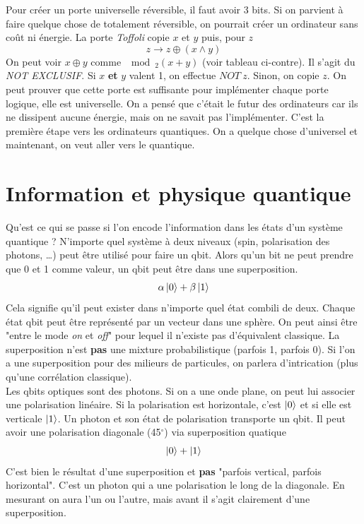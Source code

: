 Pour créer un porte universelle réversible, il faut avoir 3 bits. Si on parvient à faire 
quelque chose de totalement réversible, on pourrait créer un ordinateur sans coût ni énergie. La
porte \textit{Toffoli} copie $x$ et $y$ puis, pour $z$ 
\begin{equation}
z \to z\oplus(x\wedge  y)
\end{equation}
On peut voir $x\oplus y$ comme $\mod_2(x+y)$ (voir tableau ci-contre). Il s'agit du \textit{NOT
EXCLUSIF}. Si $x$ \textbf{et} $y$ valent 1, on effectue $NOT\ z$. Sinon, on copie $z$.
On peut prouver que cette porte est suffisante pour implémenter chaque porte logique,
elle est universelle. On a pensé que c'était le futur des ordinateurs car ils ne dissipent 
aucune énergie, mais on ne savait pas l'implémenter. C'est la première étape vers les ordinateurs
quantiques. On a quelque chose d'universel et maintenant, on veut aller vers le quantique.


\section{Information et physique quantique}
Qu'est ce qui se passe si l'on encode l'information dans les états d'un système quantique ? 
N'importe quel système à deux niveaux (spin, polarisation des photons, \dots) peut être 
utilisé pour faire un qbit. Alors qu'un bit ne peut prendre que 0 et 1 comme valeur, un 
qbit peut être dans une superposition.
\begin{equation}
\alpha\ket0+\beta\ket1
\end{equation}
Cela signifie qu'il peut exister dans n'importe quel état combili de deux. Chaque état qbit
peut être représenté par un vecteur dans une sphère. On peut ainsi être "entre le mode 
\textit{on} et \textit{off}" pour lequel il n'existe pas d'équivalent classique. La superposition
n'est \textbf{pas} une mixture probabilistique (parfois 1, parfois 0). Si l'on a une superposition
pour des milieurs de particules, on parlera d'intrication (plus qu'une corrélation classique).\\

Les qbits optiques sont des photons. Si on a une onde plane, on peut lui associer une polarisation
linéaire. Si la polarisation est horizontale, c'est $\ket 0$ et si elle est verticale $\ket 1$. Un
photon et son état de polarisation transporte un qbit. Il peut avoir une polarisation diagonale
(45$^\circ$) via superposition quatique
\begin{equation}
\ket0+\ket1
\end{equation}
C'est bien le résultat d'une superposition et \textbf{pas} "parfois vertical, parfois horizontal". 
C'est un photon qui a une polarisation le long de la diagonale. En mesurant on aura l'un ou l'autre,
mais avant il s'agit clairement d'une superposition.\\

